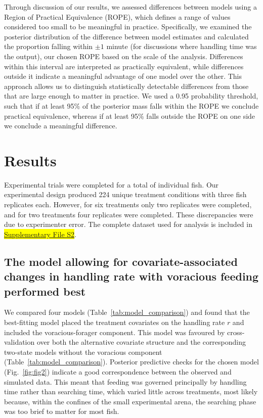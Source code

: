 \documentclass[ASNA,twocolumn]{USG} %
\begin{document}
Through discussion of our results, we assessed differences between models using a Region of Practical Equivalence (ROPE), which defines a range of values considered too small to be meaningful in practice. Specifically, we examined the posterior distribution of the difference between model estimates and calculated the proportion falling within $\pm 1$ minute (for discussions where handling time was the output), our chosen ROPE based on the scale of the analysis. Differences within this interval are interpreted as practically equivalent, while differences outside it indicate a meaningful advantage of one model over the other. This approach allows us to distinguish statistically detectable differences from those that are large enough to matter in practice. We used a 0.95 probability threshold, such that if at least 95\% of the posterior mass falls within the ROPE we conclude practical equivalence, whereas if at least 95\% falls outside the ROPE on one side we conclude a meaningful difference.

\section{Results}

Experimental trials were completed for a total of \Nfish{} individual fish. Our experimental design produced 224 unique treatment conditions with three fish replicates each. However, for six treatments only two replicates were completed, and for two treatments four replicates were completed. These discrepancies were due to experimenter error. The complete dataset used for analysis is included in \colorbox{yellow}{\hyperlink{supp:S2}{Supplementary File S2}}.

\subsection{The model allowing for covariate-associated changes in handling rate with voracious feeding performed best}
We compared four models (Table~\ref{tab:model_comparison}) and found that the best-fitting model placed the treatment covariates on the handling rate \begin{math}r\end{math} and included the voracious-forager component. This model was favoured by cross-validation over both the alternative covariate structure and the corresponding two-state models without the voracious component (Table~\ref{tab:model_comparison}). Posterior predictive checks for the chosen model (Fig.~\ref{fig:fig2}) indicate a good correspondence between the observed and simulated data. This meant that feeding was governed principally by handling time rather than searching time, which varied little across treatments, most likely because, within the confines of the small experimental arena, the searching phase was too brief to matter for most fish.
\end{document}
